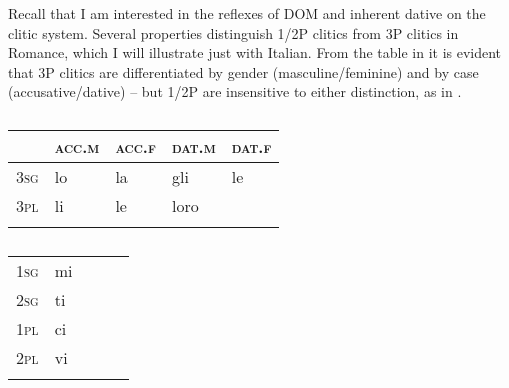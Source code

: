 \documentclass[output=paper,colorlinks,citecolor=brown,nonflat]{./langscibook}
\begin{document}
Recall that I am interested in the reflexes of DOM and inherent dative on the clitic system. {Several properties distinguish 1/2P clitics from 3P clitics in Romance, which I will illustrate just with Italian. From the table in  it is evident that 3P clitics are differentiated by gender (masculine/feminine) and by case (accusative/dative) – but 1/2P are insensitive to either distinction, as in .}


\begin{table}
\caption{\missingcaption}\label{extab:manzini:11}
\begin{tabularx}{\textwidth}{XXXXl}
\lsptoprule
 & \textsc{acc.m} & \textsc{acc.f} & \textsc{dat.m} & \textsc{dat.f}\\
 \midrule
\textsc{3sg} & {lo} & {la} & {gli} & {le}\\
\textsc{3pl} & {li} & {le} &  {loro} & \\
\lspbottomrule
\end{tabularx}
\end{table}



\begin{table}
\caption{\missingcaption}\label{extab:manzini:12}
\begin{tabularx}{\textwidth}{XXlll}
\lsptoprule
\textsc{1sg} & {mi} & & &\\
\textsc{2sg} & {ti} & & &\\
\textsc{1pl} & {ci} & & &\\
\textsc{2pl} & {vi} & & &\\
\lspbottomrule
\end{tabularx}
\end{table}
\end{document}
